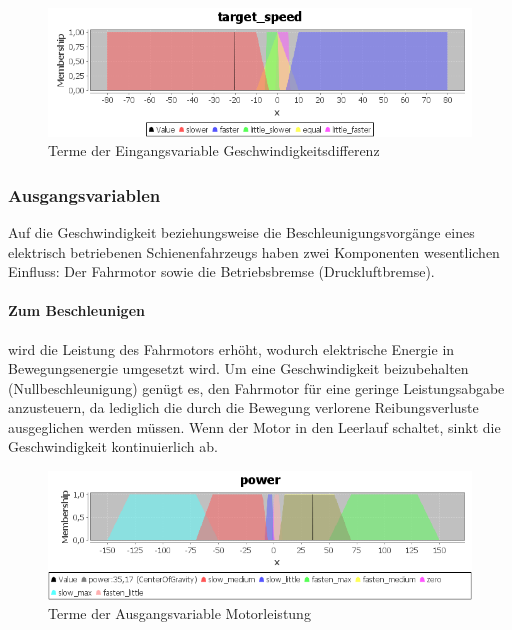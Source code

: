 \documentclass[10pt,a4paper]{article}
\begin{document}
\begin{figure}[htb]
\begin{center}
\includegraphics[width=\textwidth]{var_target_speed.png}
\caption[Eingangsvariable Geschwindigkeitsdifferenz]{Terme der Eingangsvariable Geschwindigkeitsdifferenz}
\label{var_target_speed}
\end{center}
\end{figure}

\subsubsection{Ausgangsvariablen}
Auf die Geschwindigkeit beziehungsweise die Beschleunigungsvorgänge eines elektrisch betriebenen Schienenfahrzeugs haben zwei Komponenten wesentlichen Einfluss: Der Fahrmotor sowie die Betriebsbremse (Druckluftbremse).
\paragraph{Zum Beschleunigen} wird die Leistung des Fahrmotors erhöht, wodurch elektrische Energie in Bewegungsenergie umgesetzt wird. Um eine Geschwindigkeit beizubehalten (Nullbeschleunigung) genügt es, den Fahrmotor für eine geringe Leistungsabgabe anzusteuern, da lediglich die durch die Bewegung verlorene Reibungsverluste ausgeglichen werden müssen. Wenn der Motor in den Leerlauf schaltet, sinkt die Geschwindigkeit kontinuierlich ab.

\begin{figure}[htb]
\begin{center}
\includegraphics[width=\textwidth]{var_power.png}
\caption[Ausgangsvariable Motorleistung]{Terme der Ausgangsvariable Motorleistung}
\label{var_power}
\end{center}
\end{figure}
\end{document}

